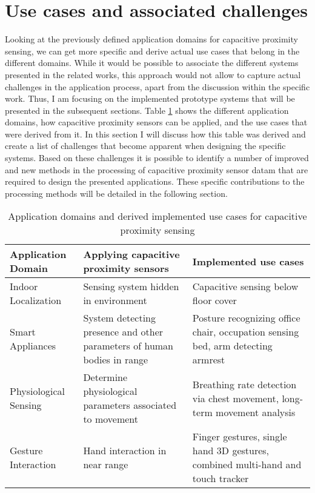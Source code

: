 \section{Use cases and associated challenges}
Looking at the previously defined application domains for capacitive proximity sensing, we can get more specific and derive actual use cases that belong in the different domains. While it would be possible to associate the different systems presented in the related works, this approach would not allow to capture actual challenges in the application process, apart from the discussion within the specific work. Thus, I am focusing on the implemented prototype systems that will be presented in the subsequent sections. Table \ref{tab:usecase_list} shows the different application domains, how capacitive proximity sensors can be applied, and the use cases that were derived from it. In this section I will discuss how this table was derived and create a list of challenges that become apparent when designing the specific systems. Based on these challenges it is possible to identify a number of improved and new methods in the processing of capacitive proximity sensor datam that are required to design the presented applications. These specific contributions to the processing methods will be detailed in the following section.

\begin{table}[htbp]
  \centering
  \caption{Application domains and derived implemented use cases for capacitive proximity sensing}
    \begin{tabularx}{\linewidth}{p{3.5cm}XX}
    \toprule
    Application Domain & Applying capacitive proximity sensors & Implemented use cases \\
    \midrule
    Indoor Localization & Sensing system hidden in environment & Capacitive sensing below floor cover \\
    Smart Appliances & System detecting presence and other parameters of human bodies in range & Posture recognizing office chair, occupation sensing bed, arm detecting armrest \\
    Physiological Sensing & Determine physiological parameters associated to movement & Breathing rate detection via chest movement, long-term movement analysis \\
    Gesture Interaction & Hand interaction in near range & Finger gestures, single hand 3D gestures, combined multi-hand and touch tracker \\
    \bottomrule
    \end{tabularx}%
  \label{tab:usecase_list}%
\end{table}%



